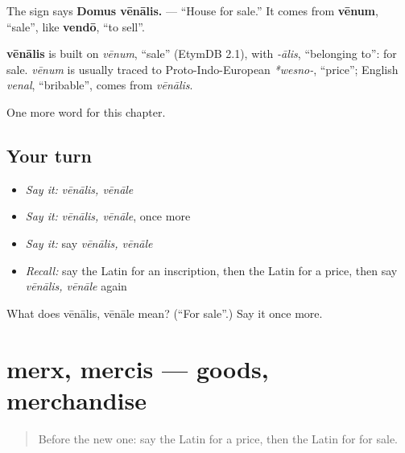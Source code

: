 The sign says \textbf{Domus vēnālis.} — \textquotedblleft{}House for sale.\textquotedblright{} It comes from \textbf{vēnum}, \textquotedblleft{}sale\textquotedblright{}, like \textbf{vendō}, \textquotedblleft{}to sell\textquotedblright{}.

\begin{cousinweb}
\textbf{vēnālis} is built on \emph{vēnum}, \textquotedblleft{}sale\textquotedblright{} (EtymDB 2.1), with \emph{-ālis}, \textquotedblleft{}belonging to\textquotedblright{}: for sale. \emph{vēnum} is usually traced to Proto-Indo-European \emph{*wesno-}, \textquotedblleft{}price\textquotedblright{}; English \emph{venal}, \textquotedblleft{}bribable\textquotedblright{}, comes from \emph{vēnālis}.
\end{cousinweb}

\begin{grammarlens}[title={What you've built}]
One more word for this chapter.
\end{grammarlens}

\subsection*{Your turn}
\begin{itemize}
\raggedright
  \item \emph{Say it:} \emph{vēnālis, vēnāle}
  \item \emph{Say it:} \emph{vēnālis, vēnāle}, once more
  \item \emph{Say it:} say \emph{vēnālis, vēnāle}
  \item \emph{Recall:} say the Latin for an inscription, then the Latin for a price, then say \emph{vēnālis, vēnāle} again
\end{itemize}

\begin{tcolorbox}[breakable,colback=teal!4,colframe=teal!35!black,title={Before you move on}]
What does vēnālis, vēnāle mean? (\textquotedblleft{}For sale\textquotedblright{}.) Say it once more.
\end{tcolorbox}
\section[merx, mercis]{merx, mercis — goods, merchandise}

\label{lesson:LA-C164-merx}



\begin{quote}
Before the new one: say the Latin for a price, then the Latin for for sale.
\end{quote}

